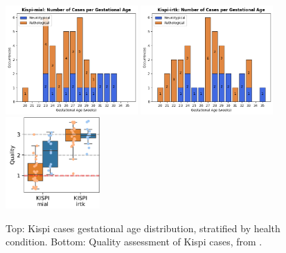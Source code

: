 \begin{figure}[hbt]
    \vspace{-5pt}
    \centering
    \includegraphics[width=0.45\textwidth]{figures/k-mial_GA.png} \quad
    \includegraphics[width=0.45\textwidth]{figures/k-irtk_GA.png}\\
    \vspace{7pt}
    \includegraphics[width=0.32\textwidth]{figures/kispi_quality.png}
    \caption{Top: Kispi cases gestational age distribution, stratified by health condition. Bottom: Quality assessment of Kispi cases, from \cite{FeTA2024_review}.}
    \label{fig:kispi_plots}
\end{figure}

